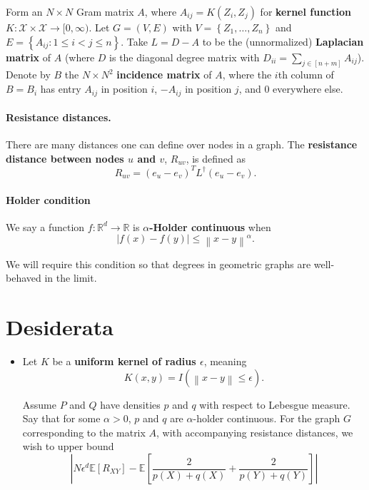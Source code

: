\documentclass{article}
\newcommand{\Reals}{\mathbb{R}}
\newcommand{\Expect}[1]{\mathbb{E}\left[ #1 \right]}
\newcommand{\norm}[1]{\left\lVert#1\right\rVert}
\newcommand{\abs}[1]{\left \lvert #1 \right \rvert}
\newcommand{\set}[1]{\left\{#1\right\}}
\newcommand{\Linv}{L^{\dagger}}
\newcommand{\Rd}{\Reals^d}
\newcommand{\R}{\Reals}
\theoremstyle{alden}
\theoremstyle{definition}
\theoremstyle{remark}
\begin{document}
Form an $N \times N$ Gram matrix $A$, where $A_{ij} = K(Z_i, Z_j)$ for \textbf{kernel function} $K: \mathcal{X} \times \mathcal{X} \to [0, \infty)$. Let $G = (V,E)$ with $V = \set{Z_1, \ldots, Z_n}$ and $E = \set{A_{ij}: 1 \leq i < j \leq n}$. Take $L = D - A$ to be the (unnormalized) \textbf{Laplacian matrix} of $A$ (where $D$ is the diagonal degree matrix with $D_{ii} = \sum_{j \in [n + m]} A_{ij}$). Denote by $B$ the $N \times N^2$ \textbf{incidence matrix} of $A$, where the $i$th column of $B = B_i$ has entry $A_{ij}$ in position $i$, $-A_{ij}$ in position $j$, and $0$ everywhere else. 

\paragraph{Resistance distances.}

There are many distances one can define over nodes in a graph. The \textbf{resistance distance between nodes $u$ and $v$}, $R_{uv}$, is defined as
\begin{equation*}
R_{uv} = (e_u - e_v)^T \Linv (e_u - e_v).
\end{equation*}

\paragraph{Holder condition}

We say a function $f: \Rd \to \R$ is \textbf{$\alpha$-Holder continuous} when
\begin{equation*}
\abs{f(x) - f(y)} \leq \norm{x - y}^{\alpha}.
\end{equation*}

We will require this condition so that degrees in geometric graphs are well-behaved in the limit.

\section{Desiderata}

\begin{itemize}
	\item Let $K$ be a \textbf{uniform kernel of radius $\epsilon$}, meaning 
	\begin{equation*}
	K(x,y) = I(\norm{x - y} \leq \epsilon).
	\end{equation*}
	
	Assume $P$ and $Q$ have densities $p$ and $q$ with respect to Lebesgue measure. Say that for some $\alpha > 0$, $p$ and $q$ are $\alpha$-holder continuous. For the graph $G$ corresponding to the matrix $A$, with accompanying resistance distances, we wish to upper bound
	\begin{equation*}
	\abs{N \epsilon^d \Expect{R_{XY}} - \Expect{\frac{2}{p(X) + q(X)} + \frac{2}{p(Y) + q(Y)}}}
	\end{equation*}
\end{itemize}
\end{document}
